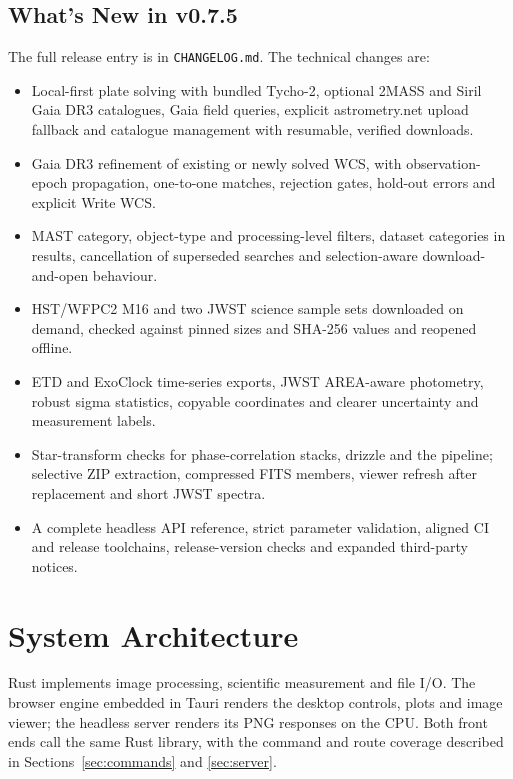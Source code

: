 \documentclass[11pt,a4paper]{article}
\newcommand{\code}[1]{\texttt{\small #1}}
\begin{document}
    \subsection{What's New in v0.7.5}

    The full release entry is in \code{CHANGELOG.md}. The technical changes are:
    \begin{itemize}[nosep]
    \item Local-first plate solving with bundled Tycho-2, optional 2MASS and Siril Gaia DR3 catalogues, Gaia field queries, explicit astrometry.net upload fallback and catalogue management with resumable, verified downloads.
    \item Gaia DR3 refinement of existing or newly solved WCS, with observation-epoch propagation, one-to-one matches, rejection gates, hold-out errors and explicit Write WCS.
    \item MAST category, object-type and processing-level filters, dataset categories in results, cancellation of superseded searches and selection-aware download-and-open behaviour.
    \item HST/WFPC2 M16 and two JWST science sample sets downloaded on demand, checked against pinned sizes and SHA-256 values and reopened offline.
    \item ETD and ExoClock time-series exports, JWST AREA-aware photometry, robust sigma statistics, copyable coordinates and clearer uncertainty and measurement labels.
    \item Star-transform checks for phase-correlation stacks, drizzle and the pipeline; selective ZIP extraction, compressed FITS members, viewer refresh after replacement and short JWST spectra.
    \item A complete headless API reference, strict parameter validation, aligned CI and release toolchains, release-version checks and expanded third-party notices.
    \end{itemize}


    \section{System Architecture}

    Rust implements image processing, scientific measurement and file I/O. The browser engine embedded in Tauri renders the desktop controls, plots and image viewer; the headless server renders its PNG responses on the CPU. Both front ends call the same Rust library, with the command and route coverage described in Sections~\ref{sec:commands} and \ref{sec:server}.
\end{document}
